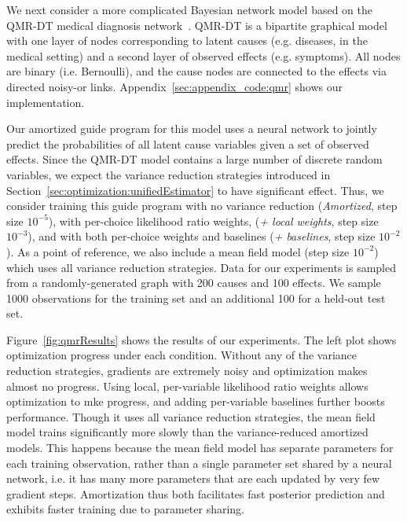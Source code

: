 We next consider a more complicated Bayesian network model based on the QMR-DT medical diagnosis network~\cite{QMR}. QMR-DT is a bipartite graphical model with one layer of nodes corresponding to latent causes (e.g. diseases, in the medical setting) and a second layer of observed effects (e.g. symptoms). All nodes are binary (i.e. Bernoulli), and the cause nodes are connected to the effects via directed noisy-or links. Appendix~\ref{sec:appendix_code:qmr} shows our implementation.

Our amortized guide program for this model uses a neural network to jointly predict the probabilities of all latent cause variables given a set of observed effects. Since the QMR-DT model contains a large number of discrete random variables, we expect the variance reduction strategies introduced in Section~\ref{sec:optimization:unifiedEstimator} to have significant effect.
Thus, we consider training this guide program with no variance reduction (\emph{Amortized}, step size $10^{-5}$), with per-choice likelihood ratio weights, (\emph{+ local weights}, step size $10^{-3}$), and with both per-choice weights and baselines (\emph{+ baselines}, step size $10^{-2}$). As a point of reference, we also include a mean field model (step size $10^{-2}$) which uses all variance reduction strategies.
Data for our experiments is sampled from a randomly-generated graph with 200 causes and 100 effects. We sample 1000 observations for the training set and an additional 100 for a held-out test set.

Figure~\ref{fig:qmrResults} shows the results of our experiments. The left plot shows optimization progress under each condition. Without any of the variance reduction strategies, gradients are extremely noisy and optimization makes almost no progress. Using local, per-variable likelihood ratio weights allows optimization to mke progress, and adding per-variable baselines further boosts performance. Though it uses all variance reduction strategies, the mean field model trains significantly more slowly than the variance-reduced amortized models. This happens because the mean field model has separate parameters for each training observation, rather than a single parameter set shared by a neural network, i.e. it has many more parameters that are each updated by very few gradient steps. Amortization thus both facilitates fast posterior prediction and exhibits faster training due to parameter sharing.

